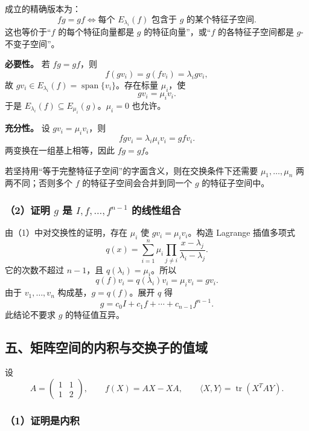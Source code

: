 \documentclass[11pt,fontset=fandol]{ctexart}
\begin{document}
成立的精确版本为： \[
\boxed{fg=gf\iff
\text{每个 }E_{\lambda_i}(f)\text{ 包含于 }g\text{ 的某个特征子空间}.}
\] 这也等价于``\(f\) 的每个特征向量都是 \(g\) 的特征向量''，或``\(f\)
的各特征子空间都是 \(g\)-不变子空间''。

\textbf{必要性。} 若 \(fg=gf\)，则 \[
f(gv_i)=g(fv_i)=\lambda_i gv_i,
\] 故 \(gv_i\in E_{\lambda_i}(f)=\operatorname{span}\{v_i\}\)。存在标量
\(\mu_i\)，使 \[
gv_i=\mu_i v_i.
\] 于是 \(E_{\lambda_i}(f)\subseteq E_{\mu_i}(g)\)。\(\mu_i=0\) 也允许。

\textbf{充分性。} 设 \(gv_i=\mu_i v_i\)，则 \[
fgv_i=\lambda_i\mu_i v_i=gfv_i.
\] 两变换在一组基上相等，因此 \(fg=gf\)。

若坚持用``等于完整特征子空间''的字面含义，则在交换条件下还需要
\(\mu_1,\ldots,\mu_n\) 两两不同；否则多个 \(f\)
的特征子空间会合并到同一个 \(g\) 的特征子空间中。

\subsubsection{\texorpdfstring{（2）证明 \(g\) 是 \(I,f,\ldots,f^{n-1}\)
的线性组合}{（2）证明 g 是 I,f,\textbackslash ldots,f\^{}\{n-1\} 的线性组合}}\label{ux8bc1ux660e-g-ux662f-ifldotsfn-1-ux7684ux7ebfux6027ux7ec4ux5408}

由（1）中对交换性的证明，存在 \(\mu_i\) 使 \(gv_i=\mu_i v_i\)。构造
Lagrange 插值多项式 \[
q(x)=\sum_{i=1}^n\mu_i
\prod_{j\ne i}\frac{x-\lambda_j}{\lambda_i-\lambda_j}.
\] 它的次数不超过 \(n-1\)，且 \(q(\lambda_i)=\mu_i\)。所以 \[
q(f)v_i=q(\lambda_i)v_i=\mu_i v_i=gv_i.
\] 由于 \(v_1,\ldots,v_n\) 构成基，\(g=q(f)\)。展开 \(q\) 得 \[
\boxed{g=c_0I+c_1f+\cdots+c_{n-1}f^{n-1}.}
\] 此结论不要求 \(g\) 的特征值互异。

\subsection{五、矩阵空间的内积与交换子的值域}\label{ux4e94ux77e9ux9635ux7a7aux95f4ux7684ux5185ux79efux4e0eux4ea4ux6362ux5b50ux7684ux503cux57df}

设 \[
A=\begin{pmatrix}1&1\\1&2\end{pmatrix},\qquad
f(X)=AX-XA,\qquad
\langle X,Y\rangle=\operatorname{tr}(X^TAY).
\]

\subsubsection{（1）证明是内积}\label{ux8bc1ux660eux662fux5185ux79ef}
\end{document}
